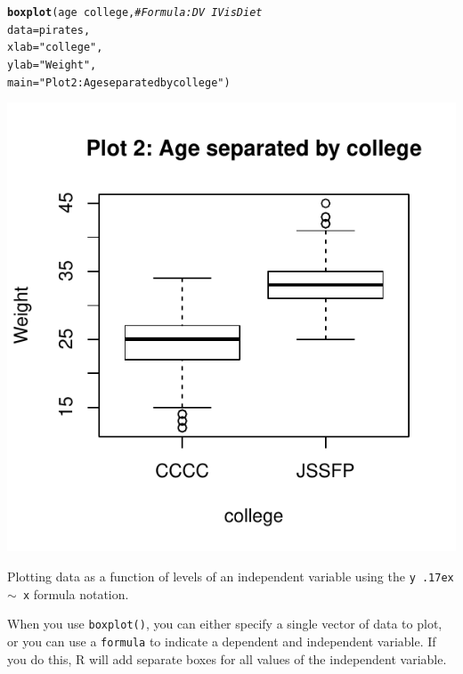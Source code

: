 \documentclass{tufte-book}\usepackage[]{graphicx}\usepackage[]{color}
\makeatletter
\def\maxwidth{ %
  \ifdim\Gin@nat@width>\linewidth
    \linewidth
  \else
    \Gin@nat@width
  \fi
}
\newcommand{\hlstr}[1]{\textcolor[rgb]{0.192,0.494,0.8}{#1}}%
\newcommand{\hlcom}[1]{\textcolor[rgb]{0.678,0.584,0.686}{\textit{#1}}}%
\newcommand{\hlopt}[1]{\textcolor[rgb]{0,0,0}{#1}}%
\newcommand{\hlstd}[1]{\textcolor[rgb]{0.345,0.345,0.345}{#1}}%
\newcommand{\hlkwc}[1]{\textcolor[rgb]{0.333,0.667,0.333}{#1}}%
\newcommand{\hlkwd}[1]{\textcolor[rgb]{0.737,0.353,0.396}{\textbf{#1}}}%
\newenvironment{kframe}{%
 \def\at@end@of@kframe{}%
 \ifinner\ifhmode%
  \def\at@end@of@kframe{\end{minipage}}%
  \begin{minipage}{\columnwidth}%
 \fi\fi%
 \def\FrameCommand##1{\hskip\@totalleftmargin \hskip-\fboxsep
 \colorbox{shadecolor}{##1}\hskip-\fboxsep
     \hskip-\linewidth \hskip-\@totalleftmargin \hskip\columnwidth}%
 \MakeFramed {\advance\hsize-\width
   \@totalleftmargin\z@ \linewidth\hsize
   \@setminipage}}%
 {\par\unskip\endMakeFramed%
 \at@end@of@kframe}
\newenvironment{knitrout}{}{} %
\makeatother
\begin{document}
\begin{marginfigure}
\begin{knitrout}
\color{fgcolor}\begin{kframe}
\begin{alltt}
\hlkwd{boxplot}\hlstd{(age} \hlopt{~} \hlstd{college,} \hlcom{# Formula: DV ~ IV is Diet}
        \hlkwc{data} \hlstd{= pirates,}
        \hlkwc{xlab} \hlstd{=} \hlstr{"college"}\hlstd{,}
        \hlkwc{ylab} \hlstd{=} \hlstr{"Weight"}\hlstd{,}
        \hlkwc{main} \hlstd{=} \hlstr{"Plot 2: Age separated by college"}\hlstd{)}
\end{alltt}
\end{kframe}
\includegraphics[width=\maxwidth]{figure/unnamed-chunk-203-1} 

\end{knitrout}

\caption{Plotting data as a function of levels of an independent variable using the \texttt{y {\raise.17ex\hbox{$\scriptstyle\sim$}} x} formula notation.}
\label{fig:boxplot2}
\end{marginfigure}

When you use \texttt{boxplot()}, you can either specify a single vector of data to plot, or you can use a \texttt{formula} to indicate a dependent and independent variable. If you do this, R will add separate boxes for all values of the independent variable.
\end{document}
